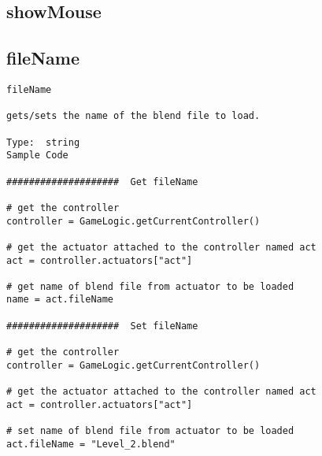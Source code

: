 \subsection{showMouse}





\subsection{fileName}
\begin{verbatim}
fileName

gets/sets the name of the blend file to load.

Type:  string
Sample Code

####################  Get fileName

# get the controller
controller = GameLogic.getCurrentController()

# get the actuator attached to the controller named act
act = controller.actuators["act"]

# get name of blend file from actuator to be loaded
name = act.fileName

####################  Set fileName

# get the controller
controller = GameLogic.getCurrentController()

# get the actuator attached to the controller named act
act = controller.actuators["act"]

# set name of blend file from actuator to be loaded
act.fileName = "Level_2.blend"
\end{verbatim}


